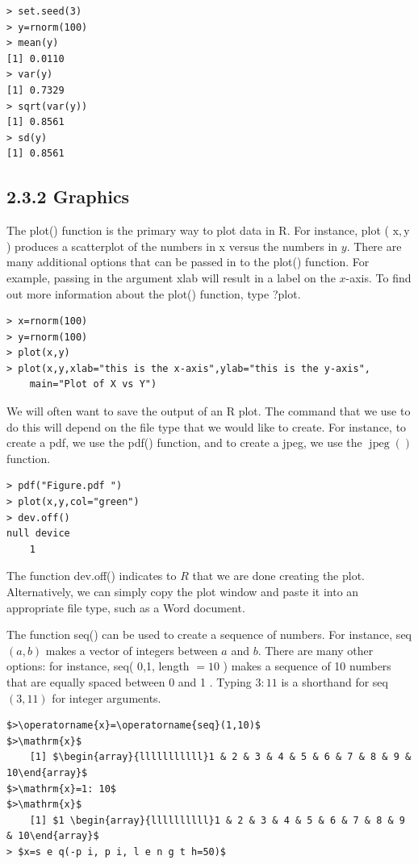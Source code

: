 \documentclass[10pt]{article}
\begin{document}
\begin{verbatim}
> set.seed(3)
> y=rnorm(100)
> mean(y)
[1] 0.0110
> var(y)
[1] 0.7329
> sqrt(var(y))
[1] 0.8561
> sd(y)
[1] 0.8561
\end{verbatim}

\subsection*{2.3.2 Graphics}
The plot() function is the primary way to plot data in R. For instance, plot ( $\mathrm{x}, \mathrm{y}$ ) produces a scatterplot of the numbers in x versus the numbers in $y$. There are many additional options that can be passed in to the plot() function. For example, passing in the argument xlab will result in a label on the $x$-axis. To find out more information about the plot() function, type ?plot.

\begin{verbatim}
> x=rnorm(100)
> y=rnorm(100)
> plot(x,y)
> plot(x,y,xlab="this is the x-axis",ylab="this is the y-axis",
    main="Plot of X vs Y")
\end{verbatim}

We will often want to save the output of an R plot. The command that we use to do this will depend on the file type that we would like to create. For instance, to create a pdf, we use the pdf() function, and to create a jpeg, we use the $\operatorname{jpeg}()$ function.

\begin{verbatim}
> pdf("Figure.pdf ")
> plot(x,y,col="green")
> dev.off()
null device
    1
\end{verbatim}

The function dev.off() indicates to $R$ that we are done creating the plot. Alternatively, we can simply copy the plot window and paste it into an appropriate file type, such as a Word document.

The function seq() can be used to create a sequence of numbers. For instance, seq $(a, b)$ makes a vector of integers between $a$ and $b$. There are many other options: for instance, seq( 0,1, length $=10$ ) makes a sequence of 10 numbers that are equally spaced between 0 and 1 . Typing $3: 11$ is a shorthand for seq $(3,11)$ for integer arguments.

\begin{verbatim}
$>\operatorname{x}=\operatorname{seq}(1,10)$
$>\mathrm{x}$
    [1] $\begin{array}{lllllllllll}1 & 2 & 3 & 4 & 5 & 6 & 7 & 8 & 9 & 10\end{array}$
$>\mathrm{x}=1: 10$
$>\mathrm{x}$
    [1] $1 \begin{array}{llllllllll}1 & 2 & 3 & 4 & 5 & 6 & 7 & 8 & 9 & 10\end{array}$
> $x=s e q(-p i, p i, l e n g t h=50)$
\end{verbatim}
\end{document}
